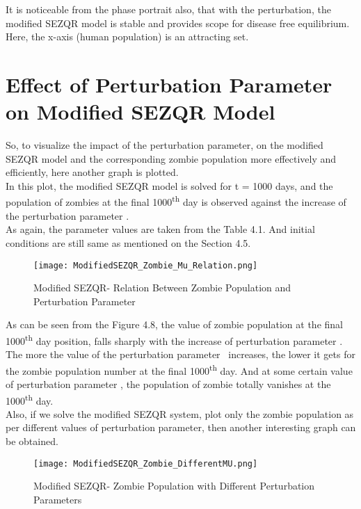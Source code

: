 It is noticeable from the phase portrait also, that with the perturbation, the modified SEZQR model is stable and provides scope for disease free equilibrium. Here, the x-axis (human population) is an attracting set. 

\pagebreak
\section{Effect of Perturbation Parameter on Modified SEZQR Model}

So, to visualize the impact of the perturbation parameter, on the modified SEZQR model and the corresponding zombie population more effectively and efficiently, here another graph is plotted. \\

In this plot, the modified SEZQR model is solved for t = 1000 days, and the population of zombies at the final 1000\textsuperscript{th} day is observed against the increase of the perturbation parameter \textmu. \\

As again, the parameter values are taken from the Table 4.1. And initial conditions are still same as mentioned on the Section 4.5. \\

\begin{figure}[H]
\centering
\texttt{[image: ModifiedSEZQR\_Zombie\_Mu\_Relation.png]}
\caption{Modified SEZQR- Relation Between Zombie Population and Perturbation Parameter}
\label{fig:Modified SEZQR Relation}
\end{figure}

As can be seen from the Figure 4.8, the value of zombie population at the final 1000\textsuperscript{th} day position, falls sharply with the increase of perturbation parameter \textmu. The more the value of the perturbation parameter \textmu \ increases, the lower it gets for the zombie population number at the final 1000\textsuperscript{th} day. And at some certain value of perturbation parameter \textmu, the population of zombie totally vanishes at the 1000\textsuperscript{th}  day. \\

Also, if we solve the modified SEZQR system, plot only the zombie population as per different values of perturbation parameter, then another interesting graph can be obtained. \\

\begin{figure}[H]
\centering
\texttt{[image: ModifiedSEZQR\_Zombie\_DifferentMU.png]}
\caption{Modified SEZQR- Zombie Population with Different Perturbation Parameters}
\label{fig:Modified SEZQR Relation02}
\end{figure}

